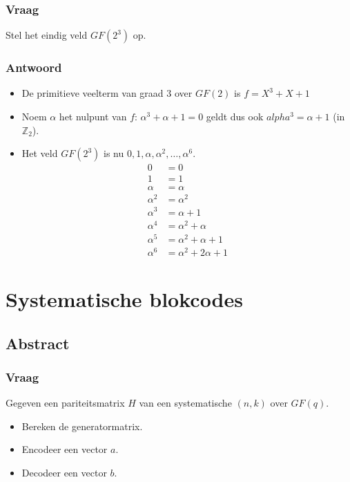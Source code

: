 \documentclass[main.tex]{subfiles}
\begin{document}
\subsubsection*{Vraag}
Stel het eindig veld $GF(2^{3})$ op.

\subsubsection*{Antwoord}
\begin{itemize}
\item De primitieve veelterm van graad $3$ over $GF(2)$ is $f=X^{3}+X+1$
\item Noem $\alpha$ het nulpunt van $f$: $\alpha^{3} + \alpha + 1=0$ geldt dus ook $alpha^{3} = \alpha + 1$ (in $\mathbb{Z}_{2}$).
\item Het veld $GF(2^{3})$ is nu $0,1,\alpha,\alpha^{2},\dotsc,\alpha^{6}$.
  \[
  \begin{array}{rl}
    0 &= 0\\
    1 &= 1\\
    \alpha &= \alpha\\
    \alpha^{2} &= \alpha^{2}\\
    \alpha^{3} &= \alpha + 1\\
    \alpha^{4} &= \alpha^{2} + \alpha\\
    \alpha^{5} &= \alpha^{2} + \alpha + 1\\
    \alpha^{6} &= \alpha^{2} + 2\alpha + 1
  \end{array}
  \]
\end{itemize}

\newpage
\section{Systematische blokcodes}
\subsection*{Abstract}
\subsubsection*{Vraag}
Gegeven een pariteitsmatrix $H$ van een systematische $(n,k)$ over $GF(q)$.
\begin{itemize}
\item Bereken de generatormatrix.
\item Encodeer een vector $a$.
\item Decodeer een vector $b$.
\end{itemize}
\end{document}
